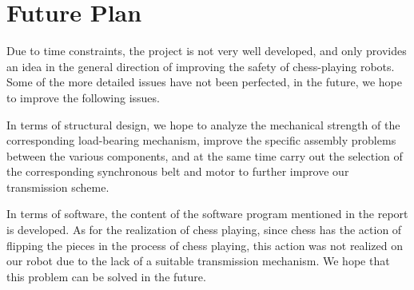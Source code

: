\documentclass[10pt, a4paper, twocolumn]{article}
\begin{document}
\section{Future Plan}
Due to time constraints, the project is not very well developed, and only provides an idea in the general direction of improving the safety of chess-playing robots. Some of the more detailed issues have not been perfected, in the future, we hope to improve the following issues.

In terms of structural design, we hope to analyze the mechanical strength of the corresponding load-bearing mechanism, improve the specific assembly problems between the various components, and at the same time carry out the selection of the corresponding synchronous belt and motor to further improve our transmission scheme.

In terms of software, the content of the software program mentioned in the report is developed. As for the realization of chess playing, since chess has the action of flipping the pieces in the process of chess playing, this action was not realized on our robot due to the lack of a suitable transmission mechanism. We hope that this problem can be solved in the future.




\end{document}
